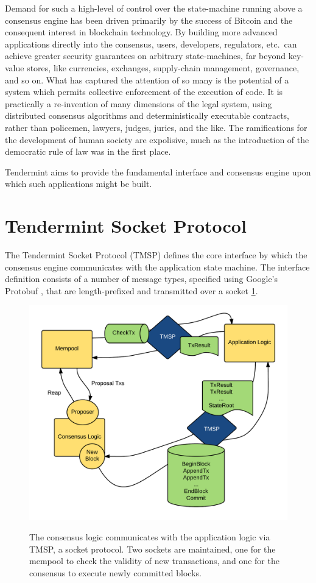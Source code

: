 Demand for such a high-level of control over the state-machine running above a consensus engine has been driven primarily by the success of Bitcoin and the consequent interest in blockchain technology.
By building more advanced applications directly into the consensus, 
users, developers, regulators, etc.~can achieve greater security guarantees on arbitrary state-machines, 
far beyond key-value stores, like currencies, exchanges, supply-chain management, governance, and so on.
What has captured the attention of so many is the potential of a system which permits collective enforcement of the execution of code.
It is practically a re-invention of many dimensions of the legal system, using distributed consensus algorithms and deterministically executable contracts,
rather than policemen, lawyers, judges, juries, and the like.
The ramifications for the development of human society are expolisive, much as the introduction of the democratic rule of law was in the first place.

Tendermint aims to provide the fundamental interface and consensus engine upon which such applications might be built.

\section{Tendermint Socket Protocol}

The Tendermint Socket Protocol (TMSP) defines the core interface by which the consensus engine communicates with the application state machine.
The interface definition consists of a number of message types, specified using Google's Protobuf \cite{protobuf}, 
that are length-prefixed and transmitted over a socket \ref{fig:tmsp}.

\begin{figure}[]
	\includegraphics[width=\linewidth,height=\textheight,keepaspectratio]{figures/tmsp.png}
    	\centering
	\label{fig:tmsp}
	\caption[TMSP Architecture]{
The consensus logic communicates with the application logic via TMSP, a socket protocol. 
Two sockets are maintained, one for the mempool to check the validity of new transactions,
and one for the consensus to execute newly committed blocks.
}
\end{figure}

